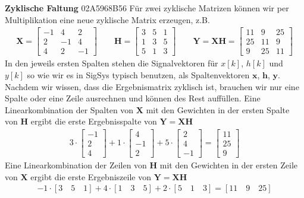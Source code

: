 \textbf{Zyklische Faltung} {\tiny 02A5968B56}
Für zwei zyklische Matrizen können wir per Multiplikation eine
neue zyklische Matrix erzeugen, z.B.
\begin{align}
\bm{X} =
\begin{bmatrix}
-1 &  4 &  2\\
 2 & -1 &  4\\
 4 &  2 & -1
\end{bmatrix}
\qquad
\bm{H} =
\begin{bmatrix}
3 & 5 & 1\\
1 & 3 & 5\\
5 & 1 & 3
\end{bmatrix}
\qquad
\bm{Y} = \bm{X}\bm{H} =
\begin{bmatrix}
11  &   9  &  25\\
25  &  11  &  9\\
 9  &  25  &  11
\end{bmatrix}
\end{align}
In den jeweils ersten Spalten stehen die Signalvektoren für $x[k]$, $h[k]$ und $y[k]$
so wie wir es in SigSys typisch benutzen, als Spaltenvektoren $\bm{x}$, $\bm{h}$, $\bm{y}$.
%
Nachdem wir wissen, dass die Ergebnismatrix zyklisch ist, brauchen wir nur
eine Spalte oder eine Zeile ausrechnen und können des Rest auffüllen.
%
Eine Linearkombination der Spalten von $\bm{X}$ mit den Gewichten in der
ersten Spalte von $\bm{H}$ ergibt die erste Ergebnisspalte von $\bm{Y}=\bm{X} \bm{H}$
\begin{align}
3\cdot
\begin{bmatrix}
-1\\
 2\\
 4
\end{bmatrix}
+
1\cdot
\begin{bmatrix}
4\\
-1\\
2
\end{bmatrix}
+5\cdot
\begin{bmatrix}
2\\
4\\
-1
\end{bmatrix}
=
\begin{bmatrix}
11\\
25\\
 9
\end{bmatrix}
\end{align}
Eine Linearkombination der Zeilen von $\bm{H}$ mit den Gewichten in der ersten Zeile
von $\bm{X}$ ergibt die erste Ergebniszeile von $\bm{Y}=\bm{X} \bm{H}$
\begin{align}
\label{eq:C8864C8D9F_LinComb_Row}
-1 \cdot [3 \quad 5 \quad 1] + 4 \cdot [1 \quad 3 \quad 5] + 2 \cdot [5 \quad 1 \quad 3] =
[11 \quad 9 \quad 25]
\end{align}
